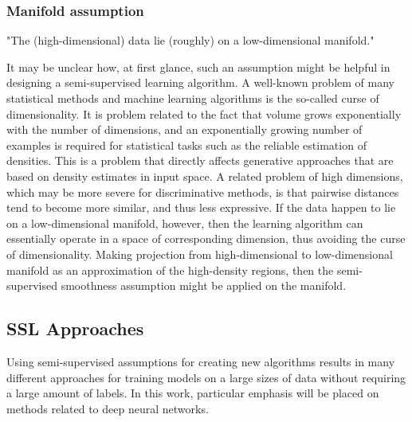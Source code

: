 \documentclass[12pt]{article}
\theoremstyle{definition}
\DeclareRobustCommand{\[}{\begin{equation}}
\DeclareRobustCommand{\]}{\end{equation}}
\begin{document}
    \subsubsection{Manifold assumption}
        "The (high-dimensional) data lie (roughly) on a low-dimensional
        manifold." \par
        It may be unclear how, at first glance, such an assumption might be helpful in designing a semi-supervised learning algorithm. A well-known problem of many statistical methods and
        machine learning algorithms is the so-called curse of dimensionality. It is
        problem related to the fact that volume grows exponentially with the number of dimensions,
        and an exponentially growing number of examples is required for statistical tasks
        such as the reliable estimation of densities. This is a problem that directly affects
        generative approaches that are based on density estimates in input space. A related
        problem of high dimensions, which may be more severe for discriminative methods,
        is that pairwise distances tend to become more similar, and thus less expressive.
        If the data happen to lie on a low-dimensional manifold, however, then the
        learning algorithm can essentially operate in a space of corresponding dimension,
        thus avoiding the curse of dimensionality.
        Making projection from high-dimensional to low-dimensional manifold as an approximation of the high-density regions, then the semi-supervised smoothness assumption might be applied on the manifold. \cite{Semi-Supervised-Book}

\subsection{SSL Approaches}
    Using semi-supervised assumptions for creating new algorithms results in many different approaches for training models on a large sizes of data without requiring a large amount of labels. In this work, particular emphasis will be placed on methods related to deep neural networks.
    
\end{document}
